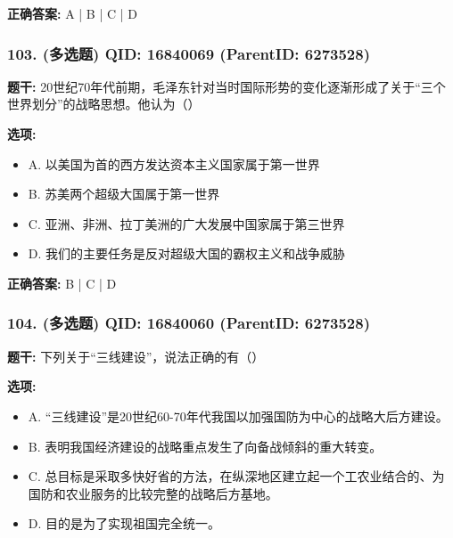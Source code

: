 \documentclass[12pt,UTF8]{ctexart}
\begin{document}
\textbf{正确答案:}
A | B | C | D

\vspace{0.3em}\hrulefill\vspace{0.7em}

\subsubsection*{103. (多选题) \small QID: 16840069 (ParentID: 6273528)}

\textbf{题干:}
20世纪70年代前期，毛泽东针对当时国际形势的变化逐渐形成了关于“三个世界划分”的战略思想。他认为（）



\textbf{选项:}
\begin{itemize}[leftmargin=*]

  \item A. 以美国为首的西方发达资本主义国家属于第一世界

  \item B. 苏美两个超级大国属于第一世界

  \item C. 亚洲、非洲、拉丁美洲的广大发展中国家属于第三世界

  \item D. 我们的主要任务是反对超级大国的霸权主义和战争威胁

\end{itemize}

\textbf{正确答案:}
B | C | D

\vspace{0.3em}\hrulefill\vspace{0.7em}

\subsubsection*{104. (多选题) \small QID: 16840060 (ParentID: 6273528)}

\textbf{题干:}
下列关于“三线建设”，说法正确的有（）



\textbf{选项:}
\begin{itemize}[leftmargin=*]

  \item A. “三线建设”是20世纪60-70年代我国以加强国防为中心的战略大后方建设。

  \item B. 表明我国经济建设的战略重点发生了向备战倾斜的重大转变。

  \item C. 总目标是采取多快好省的方法，在纵深地区建立起一个工农业结合的、为国防和农业服务的比较完整的战略后方基地。

  \item D. 目的是为了实现祖国完全统一。

\end{itemize}
\end{document}
